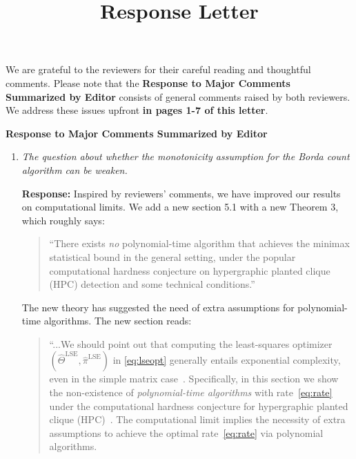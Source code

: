 \documentclass[11pt]{article}
\title{\textbf{Response Letter}}
\date{}
\author{}
\theoremstyle{plain}
\theoremstyle{definition}
\begin{document}
\maketitle
\vspace{-1.5cm}

We are grateful to the reviewers for their careful reading and thoughtful comments. Please note that the \textbf{Response to Major Comments Summarized by Editor} consists of general comments raised by both reviewers. We address these issues upfront {\bf in pages 1-7 of this letter}. 

\begin{center}
    \textbf{Response to Major Comments Summarized by Editor}
\end{center}

\begin{enumerate}[wide, labelwidth=!, labelindent=0pt]
    \item \textit{The question about whether the monotonicity assumption for the Borda count algorithm can be weaken.}
    
    \textbf{Response:}
Inspired by reviewers' comments, we have improved our results on computational limits. We add a new section 5.1 with a new Theorem 3, which roughly says:

\begin{quote}
\color{blue}
``There exists \emph{no} polynomial-time algorithm that achieves the minimax statistical bound in the general setting, under the popular computational hardness conjecture on hypergraphic planted clique (HPC) detection and some technical conditions.''
\end{quote}
The new theory has suggested the need of extra assumptions for polynomial-time algorithms. The new section reads: 
    
 
 \begin{quote}
``...We should point out that computing the least-squares optimizer $(\hat\Theta^{\text{LSE}},\hat\pi^{\text{LSE}})$ in \eqref{eq:lseopt} generally entails exponential complexity, even in the simple matrix case~\citep{gao2015rate}. {\color{blue}Specifically, in this section {\color{blue} we show the non-existence of \emph{polynomial-time algorithms} with rate~\eqref{eq:rate} under the computational hardness conjecture for hypergraphic planted clique (HPC)~\citep{luo2022tensor}. The computational limit implies the necessity of extra assumptions to achieve the optimal rate~\eqref{eq:rate} via polynomial algorithms. \\

}}
\end{quote}
\end{enumerate}
\end{document}
